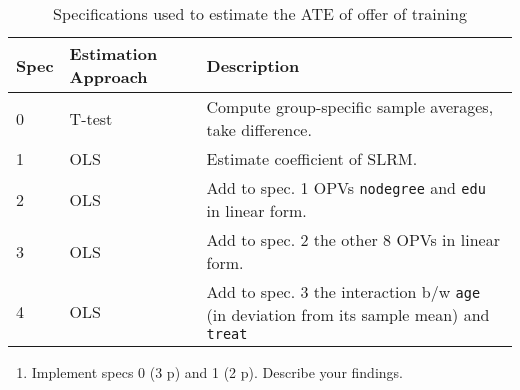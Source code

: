 \documentclass[
]{article}
\providecommand{\tightlist}{%
  \setlength{\itemsep}{0pt}\setlength{\parskip}{0pt}}
\begin{document}
\begin{table}
\begin{tabular}{|l|l|l|}
\hline
\textbf{Spec} & \textbf{Estimation Approach} & \textbf{Description} \\ \hline
0 & T-test & Compute group-specific sample averages, take difference. \\ \hline
1 & OLS & Estimate coefficient of SLRM. \\ \hline
2 & OLS & Add to spec. 1 OPVs \texttt{nodegree} and \texttt{edu} in linear form. \\ \hline
3 & OLS & Add to spec. 2 the other 8 OPVs in linear form. \\ \hline
4 & OLS & Add to spec. 3 the interaction b/w \texttt{age} (in deviation from its sample mean) and \texttt{treat} \\ \hline
\end{tabular}
\caption{Specifications used to estimate the ATE of offer of training}
\label{tab:ate-specs}
\end{table}

\begin{enumerate}
\def\labelenumi{\arabic{enumi}.}
\tightlist
\item
  Implement specs 0 (3 p) and 1 (2 p). Describe your findings.
\end{enumerate}
\end{document}

